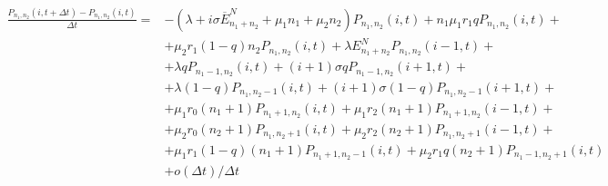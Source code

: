 \begin{adjustwidth}{-40pt}{100pt}
	\begin{align*} 
		\frac{P_{n_{1}, n_{2}}(i,t+\Delta t) - P_{n_{1}, n_{2}}(i, t)}{\Delta t}=&-(\lambda+i\sigma \overline{E}_{n_{1}+n_{2}}^N+\mu_{1}n_{1}+\mu_{2}n_{2})P_{n_{1}, n_{2}}(i,t)+ n_{1}\mu_{1}r_{1}qP_{n_{1}, n_{2}}(i,t)+\\
		&+ \mu_{2}r_{1}(1-q)n_{2}P_{n_{1}, n_{2}}(i,t)+ \lambda E_{n_{1}+n_{2}}^N P_{n_{1}, n_{2}}(i-1,t)+\\
		&+\lambda qP_{n_{1}-1, n_{2}}(i,t) + (i+1) \sigma q P_{n_{1}-1, n_{2}}(i+1,t)+\\
		&+\lambda (1-q)P_{n_{1}, n_{2}-1}(i,t) + (i+1) \sigma (1-q) P_{n_{1}, n_{2}-1}(i+1,t)+\\
		&+ \mu_{1} r_{0}(n_{1}+1) P_{n_{1} +1 , n_{2}}(i,t) + \mu_{1} r_{2} (n_{1}+1) P_{n_{1} + 1, n_{2}}(i-1,t)+\\
		&+ \mu_{2} r_{0}(n_{2}+1) P_{n_{1}, n_{2} + 1 }(i,t) + \mu_{2} r_{2} (n_{2}+1) P_{n_{1}, n_{2} + 1}(i-1,t)+\\
		&+\mu_{1} r_{1}(1-q)(n_{1}+1) P_{n_{1} +1 , n_{2}-1}(i,t)+\mu_{2} r_{1}q (n_{2}+1)P_{n_{1} -1 , n_{2}+1}(i,t) \\
		&+o(\Delta t)/\Delta t
	\end{align*}
\end{adjustwidth}

